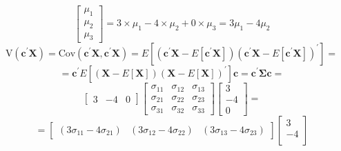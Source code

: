 \begin{enumerate}[font=\bfseries]
\begin{enumerate}
\[\begin{bmatrix}
                    \mu_1 \\
                    \mu_2 \\
                    \mu_3
                \end{bmatrix}
                =
                3 \times \mu_1 - 4 \times \mu_2 + 0 \times \mu_3
                =
                3 \mu_1 - 4 \mu_2
            \]
            \[
                \text{V}\left(\textbf{c}^\prime\textbf{X}\right)
                =
                \text{Cov}\left(\textbf{c}^\prime\textbf{X},\textbf{c}^\prime\textbf{X}\right)
                =
                E\left[\left(\textbf{c}^\prime\textbf{X} - E\left[\textbf{c}^\prime\textbf{X}\right]\right)\left(\textbf{c}^\prime\textbf{X} - E\left[\textbf{c}^\prime\textbf{X}\right]\right)^\prime\right]
                =
            \]
            \[
                =
                \textbf{c}^\prime E\left[\left(\textbf{X} - E\left[\textbf{X}\right]\right){\left(\textbf{X} - E\left[\textbf{X}\right]\right)}^\prime\right]\textbf{c}
                =
                \textbf{c}^\prime\mathbf{\Sigma}\textbf{c}
                =
            \]
            \[
                \begin{bmatrix}
                    3 & -4 & 0
                \end{bmatrix}
                \begin{bmatrix}
                    \sigma_{11} & \sigma_{12} & \sigma_{13} \\
                    \sigma_{21} & \sigma_{22} & \sigma_{23} \\
                    \sigma_{31} & \sigma_{32} & \sigma_{33}
                \end{bmatrix}
                \begin{bmatrix}
                    3 \\
                    -4 \\
                    0
                \end{bmatrix}
                =
            \]
            \[
                =
                \begin{bmatrix}
                    \left(3 \sigma_{11} - 4 \sigma_{21}\right) &
                    \left(3 \sigma_{12} - 4 \sigma_{22}\right) &
                    \left(3 \sigma_{13} - 4 \sigma_{23}\right)
                \end{bmatrix}
                \begin{bmatrix}
                    3 \\
                    -4 \\

\end{bmatrix}\]
\end{enumerate}
\end{enumerate}
